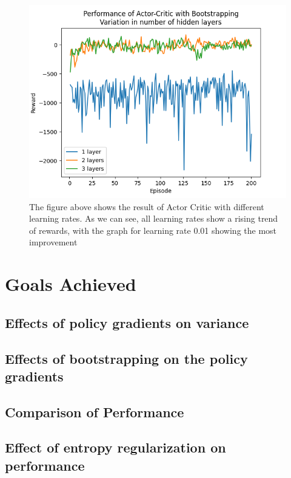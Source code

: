 \documentclass{article}
\begin{document}
\begin{figure}[htbp]
\centering
\includegraphics[width=0.9\linewidth]{Report/images/Performance_of_Actor_Critic_BS_Layers.png}
\caption{\label{fig:ActorCriticBS2-different hidden layers}The figure above shows the result of Actor Critic with different learning rates. As we can see, all learning rates show a rising trend of rewards, with the graph for learning rate 0.01 showing the most improvement}
\end{figure}

\section{Goals Achieved}
\subsection{Effects of policy gradients on variance}
\subsection{Effects of bootstrapping on the policy gradients}
\subsection{Comparison of Performance}
\subsection{Effect of entropy regularization on performance}



\end{document}
